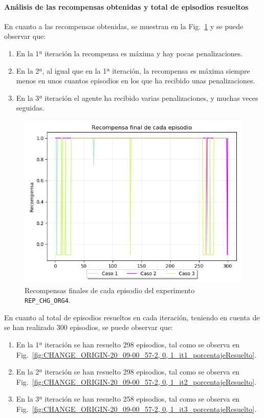 \paragraph{Análisis de las recompensas obtenidas y total de episodios resueltos} 

En cuanto a las recompensas obtenidas, se muestran en la Fig.~\ref{fig:CHANGE_ORIGIN-20_09-00_57-2, 0, 1_recompensa} y se puede observar que: 
\begin{enumerate}
    \item En la 1ª iteración la recompensa es máxima y hay pocas penalizaciones. 
    \item En la 2ª, al igual que en la 1ª iteración, la recompensa es máxima siempre menos en unos cuantos episodios en los que ha recibido unas penalizaciones. 
    \item En la 3ª iteración el agente ha recibido varias penalizaciones, y muchas veces seguidas. 
\end{enumerate}
 
\begin{figure}
    \centering
    \includegraphics[scale=0.4]{cap5_experimentacion/images/CHANGE_ORIGIN-20_09-00_57-2, 0, 1_recompensa.png}
    \caption{Recompensas finales de cada episodio del experimento \texttt{REP\_CHG\_ORG4}.}
    \label{fig:CHANGE_ORIGIN-20_09-00_57-2, 0, 1_recompensa}
\end{figure}

En cuanto al total de episodios resueltos en cada iteración, teniendo en cuenta de se han realizado 300 episodios, se puede observar que: 
\begin{enumerate}
    \item En la 1ª iteración se han resuelto 298 episodios, tal como se observa en Fig.~\ref{fig:CHANGE_ORIGIN-20_09-00_57-2, 0, 1_it1_porcentajeResuelto}.
    \item En la 2ª iteración se han resuelto 298 episodios, tal como se observa en Fig.~\ref{fig:CHANGE_ORIGIN-20_09-00_57-2, 0, 1_it2_porcentajeResuelto}.
    \item En la 3ª iteración se han resuelto 258 episodios, tal como se observa en Fig.~\ref{fig:CHANGE_ORIGIN-20_09-00_57-2, 0, 1_it3_porcentajeResuelto}.
\end{enumerate}

